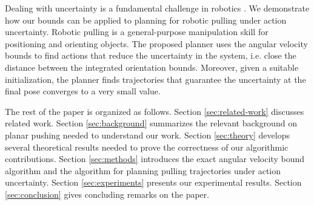 \documentclass[conference]{IEEEtran}
\begin{document}
Dealing with uncertainty is a fundamental challenge in robotics
\cite{Thrun2005}. We demonstrate how our bounds can be applied to
planning for robotic pulling under action uncertainty. Robotic pulling
is a general-purpose manipulation skill for positioning and orienting
objects. The proposed planner uses the angular velocity bounds to find
actions that reduce the uncertainty in the system, i.e. close the
distance between the integrated orientation bounds. Moreover, given a
suitable initialization, the planner finds trajectories that guarantee
the uncertainty at the final pose converges to a very small value.

The rest of the paper is organized as follows. Section
\ref{sec:related-work} discusses related work. Section
\ref{sec:background} summarizes the relevant background on planar
pushing needed to understand our work. Section \ref{sec:theory}
develops several theoretical results needed to prove the correctness
of our algorithmic contributions. Section \ref{sec:methods} introduces
the exact angular velocity bound algorithm and the algorithm for
planning pulling trajectories under action uncertainty. Section
\ref{sec:experiments} presents our experimental results. Section
\ref{sec:conclusion} gives concluding remarks on the paper.












\end{document}
